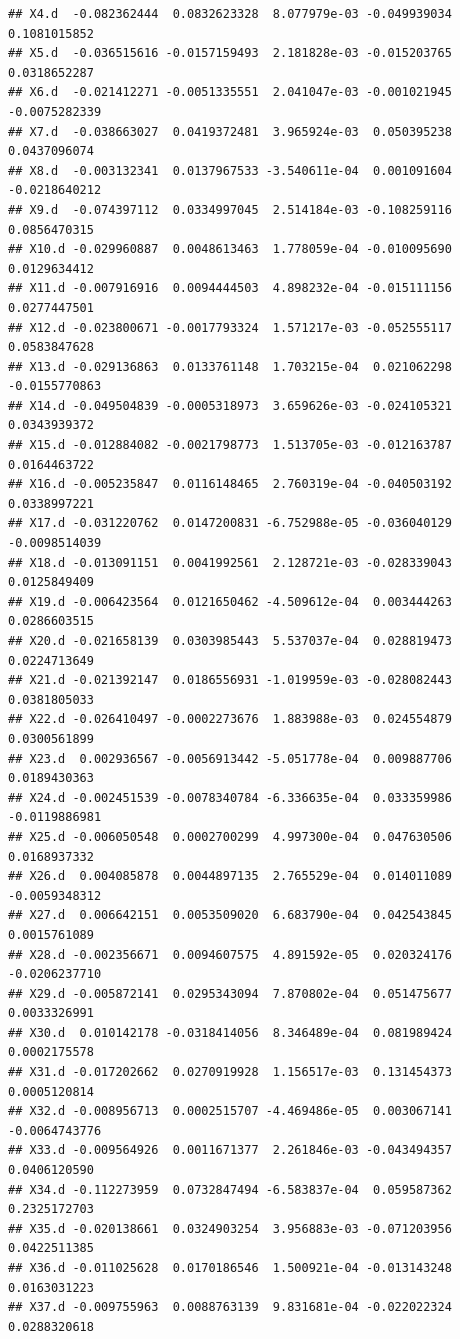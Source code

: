 \documentclass[]{article}
\begin{document}
\begin{verbatim}
## X4.d  -0.082362444  0.0832623328  8.077979e-03 -0.049939034  0.1081015852
## X5.d  -0.036515616 -0.0157159493  2.181828e-03 -0.015203765  0.0318652287
## X6.d  -0.021412271 -0.0051335551  2.041047e-03 -0.001021945 -0.0075282339
## X7.d  -0.038663027  0.0419372481  3.965924e-03  0.050395238  0.0437096074
## X8.d  -0.003132341  0.0137967533 -3.540611e-04  0.001091604 -0.0218640212
## X9.d  -0.074397112  0.0334997045  2.514184e-03 -0.108259116  0.0856470315
## X10.d -0.029960887  0.0048613463  1.778059e-04 -0.010095690  0.0129634412
## X11.d -0.007916916  0.0094444503  4.898232e-04 -0.015111156  0.0277447501
## X12.d -0.023800671 -0.0017793324  1.571217e-03 -0.052555117  0.0583847628
## X13.d -0.029136863  0.0133761148  1.703215e-04  0.021062298 -0.0155770863
## X14.d -0.049504839 -0.0005318973  3.659626e-03 -0.024105321  0.0343939372
## X15.d -0.012884082 -0.0021798773  1.513705e-03 -0.012163787  0.0164463722
## X16.d -0.005235847  0.0116148465  2.760319e-04 -0.040503192  0.0338997221
## X17.d -0.031220762  0.0147200831 -6.752988e-05 -0.036040129 -0.0098514039
## X18.d -0.013091151  0.0041992561  2.128721e-03 -0.028339043  0.0125849409
## X19.d -0.006423564  0.0121650462 -4.509612e-04  0.003444263  0.0286603515
## X20.d -0.021658139  0.0303985443  5.537037e-04  0.028819473  0.0224713649
## X21.d -0.021392147  0.0186556931 -1.019959e-03 -0.028082443  0.0381805033
## X22.d -0.026410497 -0.0002273676  1.883988e-03  0.024554879  0.0300561899
## X23.d  0.002936567 -0.0056913442 -5.051778e-04  0.009887706  0.0189430363
## X24.d -0.002451539 -0.0078340784 -6.336635e-04  0.033359986 -0.0119886981
## X25.d -0.006050548  0.0002700299  4.997300e-04  0.047630506  0.0168937332
## X26.d  0.004085878  0.0044897135  2.765529e-04  0.014011089 -0.0059348312
## X27.d  0.006642151  0.0053509020  6.683790e-04  0.042543845  0.0015761089
## X28.d -0.002356671  0.0094607575  4.891592e-05  0.020324176 -0.0206237710
## X29.d -0.005872141  0.0295343094  7.870802e-04  0.051475677  0.0033326991
## X30.d  0.010142178 -0.0318414056  8.346489e-04  0.081989424  0.0002175578
## X31.d -0.017202662  0.0270919928  1.156517e-03  0.131454373  0.0005120814
## X32.d -0.008956713  0.0002515707 -4.469486e-05  0.003067141 -0.0064743776
## X33.d -0.009564926  0.0011671377  2.261846e-03 -0.043494357  0.0406120590
## X34.d -0.112273959  0.0732847494 -6.583837e-04  0.059587362  0.2325172703
## X35.d -0.020138661  0.0324903254  3.956883e-03 -0.071203956  0.0422511385
## X36.d -0.011025628  0.0170186546  1.500921e-04 -0.013143248  0.0163031223
## X37.d -0.009755963  0.0088763139  9.831681e-04 -0.022022324  0.0288320618

\end{verbatim}
\end{document}
